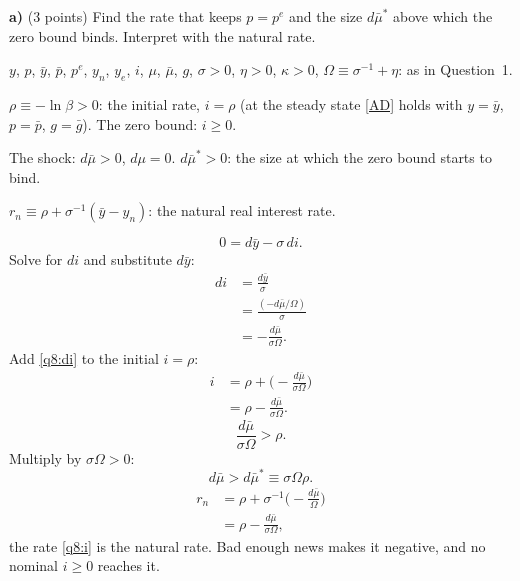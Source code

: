 \textbf{a)} (3 points) Find the rate that keeps $p=p^e$ and the size $d\bar\mu^*$ above which the zero bound binds. Interpret with the natural rate.
\resolespaco
\begin{sol}
\begin{notacao}
\item $y$, $p$, $\bar y$, $\bar p$, $p^e$, $y_n$, $y_e$, $i$, $\mu$, $\bar\mu$, $g$, $\sigma>0$, $\eta>0$, $\kappa>0$, $\Omega\equiv\sigma^{-1}+\eta$: as in Question~1.
\item $\rho\equiv-\ln\beta>0$: the initial rate, $i=\rho$ (at the steady state \eqref{AD} holds with $y=\bar y$, $p=\bar p$, $g=\bar g$). The zero bound: $i\ge0$.
\item The shock: $d\bar\mu>0$, $d\mu=0$. $d\bar\mu^*>0$: the size at which the zero bound starts to bind.
\item $r_n\equiv\rho+\sigma^{-1}(\bar y-y_n)$: the natural real interest rate.
\end{notacao}
\begin{equation}
0=d\bar y-\sigma\,di . \nonumber
\end{equation}
Solve for $di$ and substitute $d\bar y$:
\begin{align}
di&=\frac{d\bar y}{\sigma}\nonumber\\
&=\frac{(-d\bar\mu/\Omega)}{\sigma}\nonumber\\
&=-\frac{d\bar\mu}{\sigma\Omega}. \label{q8:di}
\end{align}
Add \eqref{q8:di} to the initial $i=\rho$:
\begin{align}
i&=\rho+\Big(-\frac{d\bar\mu}{\sigma\Omega}\Big)\nonumber\\
&=\rho-\frac{d\bar\mu}{\sigma\Omega}. \label{q8:i}
\end{align}
\begin{equation}
\frac{d\bar\mu}{\sigma\Omega}>\rho . \nonumber
\end{equation}
Multiply by $\sigma\Omega>0$:
\begin{equation}
d\bar\mu>d\bar\mu^*\equiv\sigma\Omega\rho . \label{q8:thr}
\end{equation}
\begin{align}
r_n&=\rho+\sigma^{-1}\Big(-\frac{d\bar\mu}{\Omega}\Big)\nonumber\\
&=\rho-\frac{d\bar\mu}{\sigma\Omega} , \nonumber
\end{align}
the rate \eqref{q8:i} is the natural rate. Bad enough news makes it negative, and no nominal $i\ge0$ reaches it.
\end{sol}

